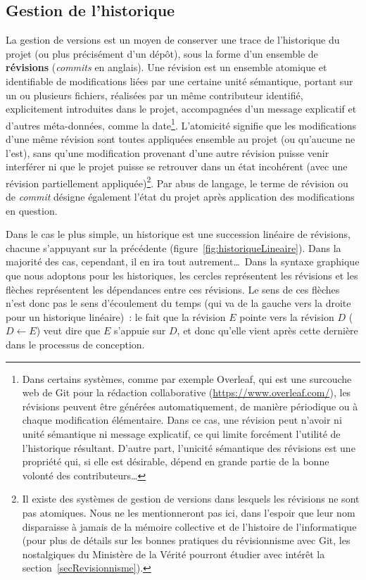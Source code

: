 \subsection{Gestion de l'historique}

La gestion de versions est un moyen de conserver une trace de
l'historique du projet (ou plus précisément d'un dépôt), sous la forme
d'un ensemble de \textbf{révisions}
(\textit{commits} en anglais). Une révision est un ensemble atomique
et identifiable de modifications liées par une certaine unité
sémantique, portant sur un ou plusieurs fichiers, réalisées par un
même contributeur identifié, explicitement introduites dans le projet,
accompagnées d'un message explicatif et d'autres méta-données, comme
la date\footnote{Dans certains systèmes, comme par exemple
  Overleaf, qui est une surcouche web de Git pour la
  rédaction collaborative (\url{https://www.overleaf.com/}), les
  révisions peuvent être générées automatiquement, de manière
  périodique ou à chaque modification élémentaire. Dans ce cas, une
  révision peut n'avoir ni unité sémantique ni message explicatif, ce
  qui limite forcément l'utilité de l'historique résultant. D'autre
  part, l'unicité sémantique des révisions est une propriété qui, si
  elle est désirable, dépend en grande partie de la bonne volonté des
  contributeurs\ldots}. L'atomicité signifie que les modifications
d'une même révision sont toutes appliquées ensemble au projet (ou
qu'aucune ne l'est), sans qu'une modification provenant d'une autre
révision puisse venir interférer ni que le projet puisse se retrouver
dans un état incohérent (avec une révision partiellement
appliquée)\footnote{Il existe des systèmes de gestion de versions dans
  lesquels les révisions ne sont pas atomiques. Nous ne les
  mentionneront pas ici, dans l'espoir que leur nom disparaisse à
  jamais de la mémoire collective et de l'histoire de l'informatique
  (pour plus de détails sur les bonnes pratiques du révisionnisme avec
  Git, les nostalgiques du Ministère de la Vérité \cite{Orwell}
  pourront étudier avec intérêt la section~\ref{secRevisionnisme}).}.
Par abus de langage, le terme de révision ou de \textit{commit}
désigne également l'état du projet après application des modifications
en question.

Dans le cas le plus simple, un historique est une succession linéaire
de révisions, chacune s'appuyant sur la précédente
(figure~\ref{fig:historiqueLineaire}). Dans la majorité des cas,
cependant, il en ira tout autrement\ldots\ Dans la syntaxe graphique
que nous adoptons pour les historiques, les cercles représentent les
révisions et les flèches représentent les dépendances entre
ces révisions. Le sens de ces flèches n'est donc pas le sens d'écoulement
du temps (qui va de la gauche vers la droite pour un historique
linéaire)~: le fait que la révision $E$ pointe vers la révision $D$
($D \leftarrow E$) veut dire que $E$ s'appuie sur $D$, et donc qu'elle
vient après cette dernière dans le processus de conception.


